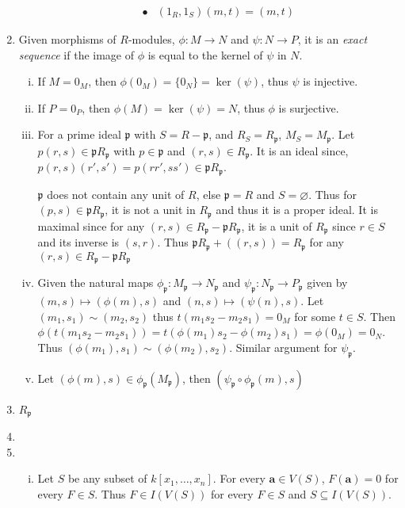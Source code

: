 \documentclass[a4paper,10pt]{article}
\theoremstyle{definition}
\begin{document}
\begin{enumerate}[1.]
\begin{enumerate}[(i)]
\begin{align*}
\bullet &(1_R,1_S)(m,t) = (m,t)
\end{align*}
\end{enumerate}
\item Given morphisms of $R$-modules, $\phi:M \to N$ and $\psi:N\to P$, it is an \emph{exact sequence} if the image of $\phi$ is equal to the kernel of $\psi$ in $N$.
\begin{enumerate}[(i)]
\item If $M=0_M$, then $\phi(0_M) = \{0_N\} = \ker(\psi)$, thus $\psi$ is injective.
\item If $P=0_P$, then $\phi(M) = \ker(\psi) = N$, thus $\phi$ is surjective.
\item For a prime ideal $\mathfrak{p}$ with $S = R - \mathfrak{p}$, and $R_S = R_\mathfrak{p}$, $M_S = M_\mathfrak{p}$. Let $p(r,s) \in \mathfrak{p}R_{\mathfrak{p}}$ with $p \in \mathfrak{p}$ and $(r,s) \in R_{\mathfrak{p}}$. It is an ideal since, $p(r,s)(r',s')=p(rr',ss') \in \mathfrak{p}R_{\mathfrak{p}}$. 


$\mathfrak{p}$ does not contain any unit of $R$, else $\mathfrak{p} = R$ and $S = \varnothing$. Thus for $(p,s) \in \mathfrak{p}R_{\mathfrak{p}}$, it is not a unit in $R_{\mathfrak{p}}$ and thus it is a proper ideal. It is maximal since for any $(r,s) \in R_{\mathfrak{p}}-\mathfrak{p}R_{\mathfrak{p}}$, it is a unit of $R_{\mathfrak{p}}$ since $r \in S$ and its inverse is $(s,r)$. Thus $\mathfrak{p}R_{\mathfrak{p}}+((r,s)) = R_{\mathfrak{p}}$ for any $(r,s) \in R_{\mathfrak{p}}-\mathfrak{p}R_{\mathfrak{p}}$

\item Given the natural maps $\phi_\mathfrak{p}:M_{\mathfrak{p}} \to N_{\mathfrak{p}}$ and $\psi_\mathfrak{p}:N_{\mathfrak{p}} \to P_{\mathfrak{p}}$ given by $(m,s) \mapsto (\phi(m),s)$ and $(n,s) \mapsto (\psi(n),s)$. Let $(m_1,s_1) \sim (m_2,s_2)$ thus $t(m_1s_2-m_2s_1)=0_M$ for some $t \in S$. Then $\phi(t(m_1s_2-m_2s_1))=t(\phi(m_1)s_2-\phi(m_2)s_1)=\phi(0_M)=0_N$. Thus $(\phi(m_1),s_1)\sim(\phi(m_2),s_2)$. Similar argument for $\psi_{\mathfrak{p}}$. 
\item Let $(\phi(m),s) \in \phi_{\mathfrak{p}}(M_{\mathfrak{p}})$, then $(\psi_{\mathfrak{p}}\circ\phi_{\mathfrak{p}}(m),s)$
\end{enumerate}

\item
$R_{\mathfrak{p}}$


\item

\item
\begin{enumerate}[(i)]
\item Let $S$ be any subset of $k[x_1,\ldots,x_n]$. For every $\mathbf{a} \in V(S)$, $F(\mathbf{a}) = 0$ for every $F \in S$. Thus $F \in I(V(S))$ for every $F \in S$ and $S \subseteq I(V(S))$.




\end{enumerate}
\end{enumerate}
\end{document}
